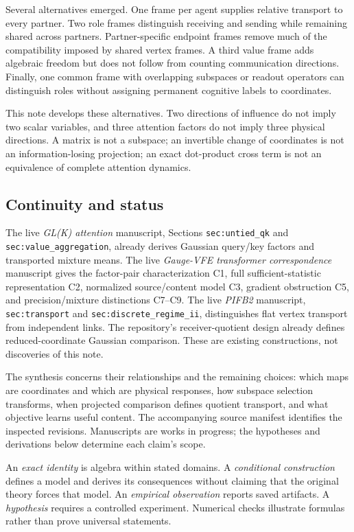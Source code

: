 \documentclass[11pt,letterpaper]{article}
\theoremstyle{remark}
\begin{document}
Several alternatives emerged. One frame per agent supplies relative transport to every partner. Two role frames distinguish receiving and sending while remaining shared across partners. Partner-specific endpoint frames remove much of the compatibility imposed by shared vertex frames. A third value frame adds algebraic freedom but does not follow from counting communication directions. Finally, one common frame with overlapping subspaces or readout operators can distinguish roles without assigning permanent cognitive labels to coordinates.

This note develops these alternatives. Two directions of influence do not imply two scalar variables, and three attention factors do not imply three physical directions. A matrix is not a subspace; an invertible change of coordinates is not an information-losing projection; an exact dot-product cross term is not an equivalence of complete attention dynamics.

\subsection{Continuity and status}
The live \emph{GL(K) attention} manuscript, Sections \texttt{sec:untied\_qk} and \texttt{sec:value\_aggregation}, already derives Gaussian query/key factors and transported mixture means. The live \emph{Gauge-VFE transformer correspondence} manuscript gives the factor-pair characterization C1, full sufficient-statistic representation C2, normalized source/content model C3, gradient obstruction C5, and precision/mixture distinctions C7--C9. The live \emph{PIFB2} manuscript, \texttt{sec:transport} and \texttt{sec:discrete\_regime\_ii}, distinguishes flat vertex transport from independent links. The repository's receiver-quotient design already defines reduced-coordinate Gaussian comparison. These are existing constructions, not discoveries of this note.

The synthesis concerns their relationships and the remaining choices: which maps are coordinates and which are physical responses, how subspace selection transforms, when projected comparison defines quotient transport, and what objective learns useful content. The accompanying source manifest identifies the inspected revisions. Manuscripts are works in progress; the hypotheses and derivations below determine each claim's scope.

An \emph{exact identity} is algebra within stated domains. A \emph{conditional construction} defines a model and derives its consequences without claiming that the original theory forces that model. An \emph{empirical observation} reports saved artifacts. A \emph{hypothesis} requires a controlled experiment. Numerical checks illustrate formulas rather than prove universal statements.
\end{document}

